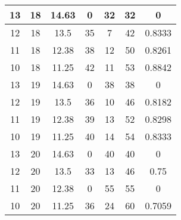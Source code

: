 \documentclass[letterpaper, 12pt]{article}
\begin{document}
\begin{longtable}{|c|c|c|c|c|c|c|}
\hline
13 & 18 & 14.63 & 0 & 32 & 32 & 0 \\
\hline
12 & 18 & 13.5 & 35 & 7 & 42 & 0.8333 \\
\hline
11 & 18 & 12.38 & 38 & 12 & 50 & 0.8261 \\
\hline
10 & 18 & 11.25 & 42 & 11 & 53 & 0.8842 \\
\hline
13 & 19 & 14.63 & 0 & 38 & 38 & 0 \\
\hline
12 & 19 & 13.5 & 36 & 10 & 46 & 0.8182 \\
\hline
11 & 19 & 12.38 & 39 & 13 & 52 & 0.8298 \\
\hline
10 & 19 & 11.25 & 40 & 14 & 54 & 0.8333 \\
\hline
13 & 20 & 14.63 & 0 & 40 & 40 & 0 \\
\hline
12 & 20 & 13.5 & 33 & 13 & 46 & 0.75 \\
\hline
11 & 20 & 12.38 & 0 & 55 & 55 & 0 \\
\hline
10 & 20 & 11.25 & 36 & 24 & 60 & 0.7059 \\
\hline
\end{longtable}
\end{document}

